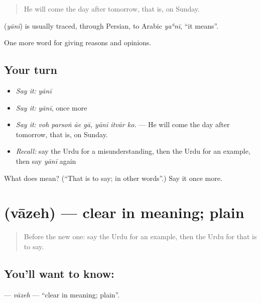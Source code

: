 \begin{quote}
He will come the day after tomorrow, that is, on Sunday.
\end{quote}

\begin{cousinweb}
\textbf{} (\emph{yānī}) is usually traced, through Persian, to Arabic \emph{yaʿnī}, \textquotedblleft{}it means\textquotedblright{}.
\end{cousinweb}

\begin{grammarlens}[title={What you've built}]
One more word for giving reasons and opinions.
\end{grammarlens}

\subsection*{Your turn}
\begin{itemize}
\raggedright
  \item \emph{Say it:} \emph{yānī}
  \item \emph{Say it:} \emph{yānī}, once more
  \item \emph{Say it:} \emph{voh parsoṅ āe gā, yānī itvār ko.} — He will come the day after tomorrow, that is, on Sunday.
  \item \emph{Recall:} say the Urdu for a misunderstanding, then the Urdu for an example, then say \emph{yānī} again
\end{itemize}

\begin{tcolorbox}[breakable,colback=teal!4,colframe=teal!35!black,title={Before you move on}]
What does  mean? (\textquotedblleft{}That is to say; in other words\textquotedblright{}.) Say it once more.
\end{tcolorbox}
\section[\texorpdfstring{\ur{واضح} (vāzeh)}{واضح (vāzeh)}]{ (vāzeh) — clear in meaning; plain}

\label{lesson:UR-C338-vazeh}



\begin{quote}
Before the new one: say the Urdu for an example, then the Urdu for that is to say.
\end{quote}

\subsection*{You'll want to know: }
\textbf{} — \emph{vāzeh} — \textquotedblleft{}clear in meaning; plain\textquotedblright{}.

